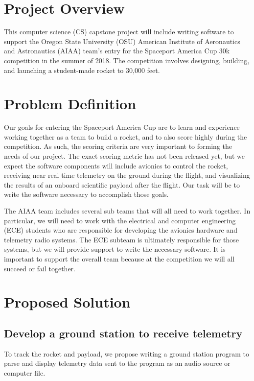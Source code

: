 \documentclass[onecolumn, draftclsnofoot,10pt, compsoc]{IEEEtran}
\begin{document}
\section{Project Overview}
This computer science (CS) capstone project will include writing software to support the Oregon State University (OSU) American Institute of Aeronautics and Astronautics (AIAA) team's entry for the Spaceport America Cup 30k competition in the summer of 2018.  The competition involves designing, building, and launching a student-made rocket to 30,000 feet.

\section{Problem Definition}

Our goals for entering the Spaceport America Cup are to learn and experience working together as a team to build a rocket, and to also score highly during the competition.  As such, the scoring criteria are very important to forming the needs of our project.  The exact scoring metric has not been released yet, but we expect the software components will include avionics to control the rocket, receiving near real time telemetry on the ground during the flight, and visualizing the results of an onboard scientific payload after the flight.  Our task will be to write the software necessary to accomplish those goals.

The AIAA team includes several sub teams that will all need to work together.  In particular, we will need to work with the electrical and computer engineering (ECE) students who are responsible for developing the avionics hardware and telemetry radio systems.  The ECE subteam is ultimately responsible for those systems, but we will provide support to write the necessary software.  It is important to support the overall team because at the competition we will all succeed or fail together.

\section{Proposed Solution}

\subsection{Develop a ground station to receive telemetry}
To track the rocket and payload, we propose writing a ground station program to parse and display telemetry data sent to the program as an audio source or computer file.
\end{document}
